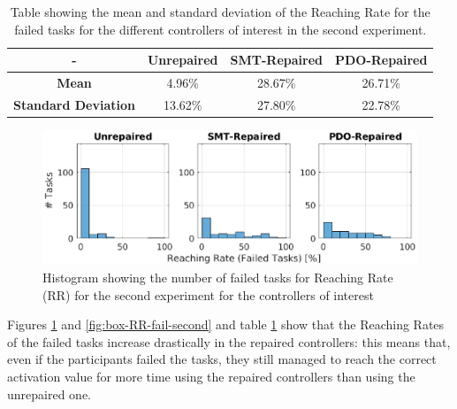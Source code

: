 \begin{table}[H]
    \centering
    \begin{tabular}{|c|c|c|c|}
        \hline
        - & \textbf{Unrepaired} & \textbf{SMT-Repaired} & \textbf{PDO-Repaired} \\
        \hline
        \textbf{Mean} & 4.96\% & 28.67\% & 26.71\% \\
        \textbf{Standard Deviation} & 13.62\% & 27.80\% & 22.78\% \\
        \hline
    \end{tabular}
    \caption{Table showing the mean and standard deviation of the Reaching Rate for the failed tasks for the different controllers of interest in the second experiment.}
    \label{tab:RR-fail-second-mean-std}
\end{table}
\begin{figure}[H]
    \centering
    \includegraphics[width=\textwidth]{Images/second-experiment/exp1_RR_fail_hist.eps}
    \caption{Histogram showing the number of failed tasks for Reaching Rate (RR) for the second experiment for the controllers of interest}
    \label{fig:hist-RR-fail-second}
\end{figure}
Figures \ref{fig:hist-RR-fail-second} and \ref{fig:box-RR-fail-second} and table \ref{tab:RR-fail-second-mean-std} show that the Reaching Rates of the failed tasks increase drastically in the repaired controllers: this means that, even if the participants failed the tasks, they still managed to reach the correct activation value for more time using the repaired controllers than using the unrepaired one. 
%
%
